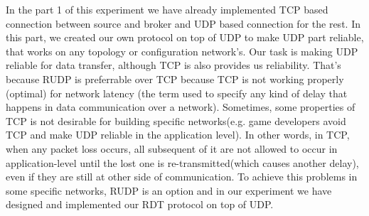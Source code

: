 In the part 1 of this experiment we have already implemented TCP based connection between source and broker and UDP based connection for the rest. In this part, we created our own protocol on top of UDP to make UDP part reliable, that works on any topology or configuration network's. Our task is making UDP reliable for data transfer, although TCP is also provides us reliability. That's because RUDP is preferrable over TCP because TCP is not working properly (optimal) for network latency (the term used to specify any kind of delay that happens in data communication over a network). Sometimes, some properties of TCP is not desirable for building specific networks(e.g. game developers avoid TCP and make UDP reliable in the application level). In other words, in TCP, when any packet loss occurs, all subsequent of it are not allowed to occur in application-level until the lost one is re-transmitted(which causes another delay), even if they are still at other side of communication. To achieve this problems in some specific networks, RUDP is an option and in our experiment we have designed and implemented our RDT protocol on top of UDP.